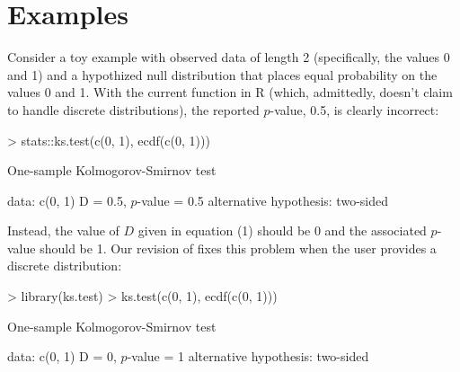 \section{Examples}

Consider a toy example with observed data of length 2 (specifically, the
values 0 and 1) and a hypothized null distribution that places equal
probability on the values 0 and 1.  With the current  function
in R (which, admittedly, doesn't claim to handle discrete distributions),
the reported $p$-value, 0.5, is clearly incorrect:
\begin{Schunk}
\begin{Sinput}
> stats::ks.test(c(0, 1), ecdf(c(0, 1)))
\end{Sinput}
\begin{Soutput}
	One-sample Kolmogorov-Smirnov test

data:  c(0, 1) 
D = 0.5, $p$-value = 0.5
alternative hypothesis: two-sided 
\end{Soutput}
\end{Schunk}
Instead, the value of $D$ given in equation (1)
should be 0 and the associated $p$-value should be 1.  
Our revision of 
fixes this problem when the user provides a discrete distribution:
\begin{Schunk} 
\begin{Sinput}
> library(ks.test)
> ks.test(c(0, 1), ecdf(c(0, 1)))
\end{Sinput}
\begin{Soutput}
	One-sample Kolmogorov-Smirnov test

data:  c(0, 1) 
D = 0, $p$-value = 1
alternative hypothesis: two-sided 
\end{Soutput}
\end{Schunk}

